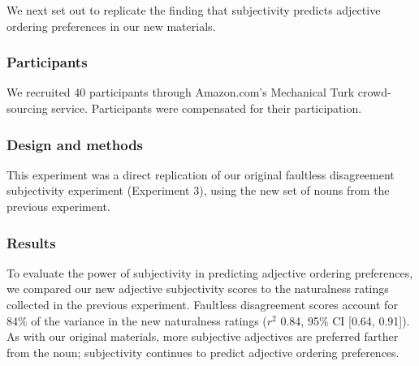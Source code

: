 \documentclass[12pt]{article}
\begin{document}
We next set out to replicate the finding that subjectivity predicts adjective ordering preferences in our new materials.

\subsubsection{Participants}

We recruited 40 participants through Amazon.com's Mechanical Turk crowd-sourcing service. Participants were compensated for their participation.

\subsubsection{Design and methods}

This experiment was a direct replication of our original faultless disagreement subjectivity experiment (Experiment 3), using the new set of nouns from the previous experiment.

\subsubsection{Results}

To evaluate the power of subjectivity in predicting adjective ordering preferences, we compared our new adjective subjectivity scores to the naturalness ratings collected in the previous experiment. 
Faultless disagreement scores account for  84\% of the variance in the new naturalness ratings ($r^2$ 0.84, 95\% CI [0.64,  0.91]). 
As with our original materials, more subjective adjectives are preferred farther from the noun; subjectivity continues to predict adjective ordering preferences.
\end{document}
